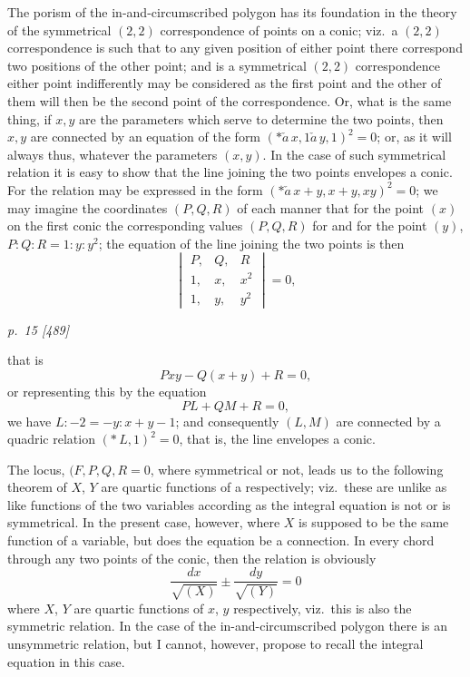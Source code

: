 \documentclass[11pt,a4paper]{book}
\begin{document}
The porism of the in-and-circumscribed polygon has its foundation in the theory
of the symmetrical $(2,2)$ correspondence of points on a conic; viz.\ a $(2,2)$ correspondence is such that to any given position of either point there correspond two
positions of the other point; and is a symmetrical $(2,2)$ correspondence either point
indifferently may be considered as the first point and the other of them will then be
the second point of the correspondence.  Or, what is the same thing, if $x, y$ are the
parameters which serve to determine the two points, then $x, y$ are connected by an
equation of the form $(*\!\check{a}\,x, 1\check{a}\,y, 1)^2 = 0$; or, as it will always thus, whatever the
parameters $(x, y)$.  In the case of such symmetrical relation it is easy to show that
the line joining the two points envelopes a conic.  For the relation may be expressed
in the form $(*\!\check{a}\,x + y, x + y, xy)^2 = 0$; we may imagine the coordinates $(P, Q, R)$ of
each manner that for the point $(x)$ on the first conic the corresponding values $(P, Q, R)$ for
and for the point $(y)$, $P : Q : R = 1 : y : y^2$; the equation of the line joining the two points is then
\[
\begin{vmatrix}
P, & Q, & R \\
1, & x, & x^2 \\
1, & y, & y^2
\end{vmatrix} = 0,
\]

\clearpage

\bigskip
\textit{p.~15 [489]}
\smallskip

\noindent
that is
\[
P x y - Q (x + y) + R = 0,
\]
or representing this by the equation
\[
P L + Q M + R = 0,
\]
we have $L : -2 = -y : x + y - 1$; and consequently $(L, M)$ are connected by a quadric relation $(\ast\,L, 1)^2 = 0$, that is, the line envelopes a conic.

The locus, $(F, P, Q, R = 0$, where symmetrical or not, leads us to the following theorem of $X$, $Y$ are quartic functions of a respectively; viz.\ these are unlike as like functions of the two variables according as the integral equation is not or is symmetrical.  In the present case, however, where $X$ is supposed to be the same function of a variable, but does the equation be a connection.  In every chord through any
two points of the conic, then the relation is obviously
\[
\frac{dx}{\sqrt{(X) }} \pm \frac{dy}{\sqrt{(Y)}} = 0
\]
where $X$, $Y$ are quartic functions of $x$, $y$ respectively, viz.\ this is also the symmetric relation.  In the case of the in-and-circumscribed polygon there is an unsymmetric relation, but I cannot, however, propose to recall the integral equation in this case.
\end{document}
